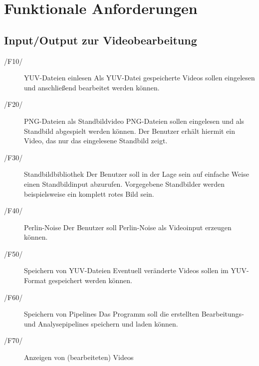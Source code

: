 \section{Funktionale Anforderungen}

\subsection{Input/Output zur Videobearbeitung}
 
\begin{description}
        \item[/F10/]YUV-Dateien einlesen \newline
                Als YUV-Datei gespeicherte Videos sollen eingelesen und anschließend bearbeitet werden können.
        \item[/F20/]PNG-Dateien als Standbildvideo\newline
                PNG-Dateien sollen eingelesen und als Standbild abgespielt werden können. Der Benutzer erhält hiermit ein Video, das nur das eingelesene Standbild zeigt.
        \item[/F30/]Standbildbibliothek \newline
                Der Benutzer soll in der Lage sein auf einfache Weise einen Standbildinput abzurufen. Vorgegebene Standbilder werden beispielsweise ein komplett rotes Bild sein.
        \item[/F40/]Perlin-Noise \newline
                Der Benutzer soll Perlin-Noise als Videoinput erzeugen können.
        \item[/F50/]Speichern von YUV-Dateien \newline
                Eventuell veränderte Videos sollen im YUV-Format gespeichert werden können.
        \item[/F60/]Speichern von Pipelines \newline
                Das Programm soll die erstellten Bearbeitungs- und Analysepipelines speichern und laden können.
        \item[/F70/]Anzeigen von (bearbeiteten) Videos
\end{description}
 
